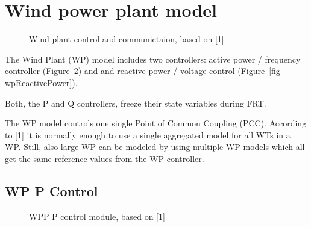 \documentclass[
  a4paper,
  DIV=11,
  numbers=noendperiod]{scrartcl}
\begin{document}
\section{Wind power plant model}\label{wind-power-plant-model}

\begin{figure}


\caption{\label{fig-wp}Wind plant control and communictaion, based on
{[}1{]}}

\end{figure}%

The Wind Plant (WP) model includes two controllers: active power /
frequency controller (Figure~\ref{fig-wpActivePower}) and and reactive
power / voltage control (Figure~\ref{fig-wpReactivePower}).

Both, the P and Q controllers, freeze their state variables during FRT.

The WP model controls one single Point of Common Coupling (PCC).
According to {[}1{]} it is normally enough to use a single aggregated
model for all WTs in a WP. Still, also large WP can be modeled by using
multiple WP models which all get the same reference values from the WP
controller.

\subsection{WP P Control}\label{wp-p-control}

\begin{figure}


\caption{\label{fig-wpActivePower}WPP P control module, based on
{[}1{]}}

\end{figure}%
\end{document}
